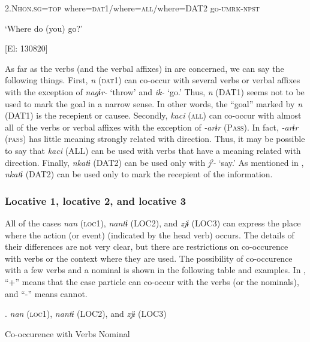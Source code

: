     2.N\textsc{hon}.\textsc{sg}=\textsc{top}  where=\textsc{dat}1/where=\textsc{all}/where=DAT2  go-\textsc{umrk}-\textsc{npst}

     ‘Where do (you) go?’

    [El: 130820]

As far as the verbs (and the verbal affixes) in  are concerned, we can say the following things. First, \textit{n} (\textsc{dat}1) can co-occur with several verbs or verbal affixes with the exception of \textit{nagɨr-} ‘throw’ and \textit{ik-} ‘go.’ Thus, \textit{n} (DAT1) seems not to be used to mark the goal in a narrow sense. In other words, the “goal” marked by \textit{n} (DAT1) is the recepient or causee. Secondly, \textit{kaci} (\textsc{all}) can co-occur with almost all of the verbs or verbal affixes with the exception of \textit{{}-arɨr} (P\textsc{ass}). In fact, \textit{{}-arɨr} (\textsc{pass}) has little meaning strongly related with direction. Thus, it may be possible to say that \textit{kaci} (ALL) can be used with verbs that have a meaning related with direction. Finally, \textit{nkatɨ} (DAT2) can be used only with \textit{jˀ-} ‘say.’ As mentioned in , \textit{nkatɨ} (DAT2) can be used only to mark the recepient of the information.

\subsubsection{Locative 1, locative 2, and locative 3}

All of the cases \textit{nan} (\textsc{loc}1), \textit{nantɨ} (LOC2), and \textit{zjɨ} (LOC3) can express the place where the action (or event) (indicated by the head verb) occurs. The details of their differences are not very clear, but there are restrictions on co-occurence with verbs or the context where they are used. The possibility of co-occurence with a few verbs and a nominal is shown in the following table and examples. In , “+” means that the case particle can co-occur with the verbs (or the nominals), and “-” means cannot.

\begin{styleBeschriftung}
\textmd{.} \textmd{\textit{nan}}\textmd{ (\textsc{loc}1),} \textmd{\textit{nantɨ}}\textmd{ (LOC2), and} \textmd{\textit{zjɨ}}\textmd{ (LOC3)}
\end{styleBeschriftung}

Co-occurence with  Verbs        Nominal

